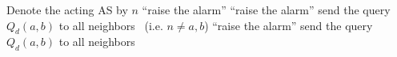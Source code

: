 \documentclass[10pt]{article}
\begin{document}
  \begin{algorithmic}[1]
    \State Denote the acting AS by $n$
        \State \Return
      \EndIf
          \State ``raise the alarm'' \label{line:sourceRaise}
        \EndIf
        \State \Return
      \EndIf
          \State``raise the alarm'' \label{line:targetRaise}
        \Else
          \State send the query $Q_d(a,b)$ to all neighbors
            \label{line:falseNegativeForward}
        \EndIf
      \Else \ (i.e. $n \neq a,b$)
          \State ``raise the alarm'' \label{line:otherRaise}
        \Else
          \State send the query $Q_d(a,b)$ to all neighbors
            \label{line:cluelessForward}
        \EndIf
      \EndIf
    \EndFunction

  \end{algorithmic}
\end{document}
